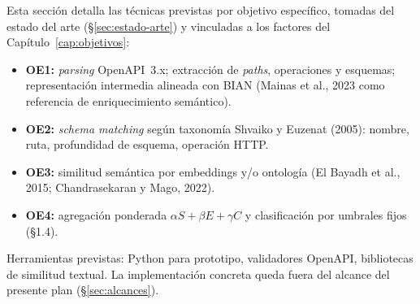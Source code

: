 Esta sección detalla las técnicas previstas por objetivo específico, tomadas del estado del arte
(§\ref{sec:estado-arte}) y vinculadas a los factores del Capítulo~\ref{cap:objetivos}:

\begin{itemize}
  \item \textbf{OE1:} \textit{parsing} OpenAPI~3.x; extracción de \textit{paths}, operaciones y
        esquemas; representación intermedia alineada con BIAN (Mainas et al., 2023 como referencia
        de enriquecimiento semántico).
  \item \textbf{OE2:} \textit{schema matching} según taxonomía Shvaiko y Euzenat (2005): nombre,
        ruta, profundidad de esquema, operación HTTP.
  \item \textbf{OE3:} similitud semántica por embeddings y/o ontología (El Bayadh et al., 2015;
        Chandrasekaran y Mago, 2022).
  \item \textbf{OE4:} agregación ponderada $\alpha S + \beta E + \gamma C$ y clasificación por
        umbrales fijos (§1.4).
\end{itemize}

Herramientas previstas: Python para prototipo, validadores OpenAPI, bibliotecas de similitud textual.
La implementación concreta queda fuera del alcance del presente plan (§\ref{sec:alcances}).
